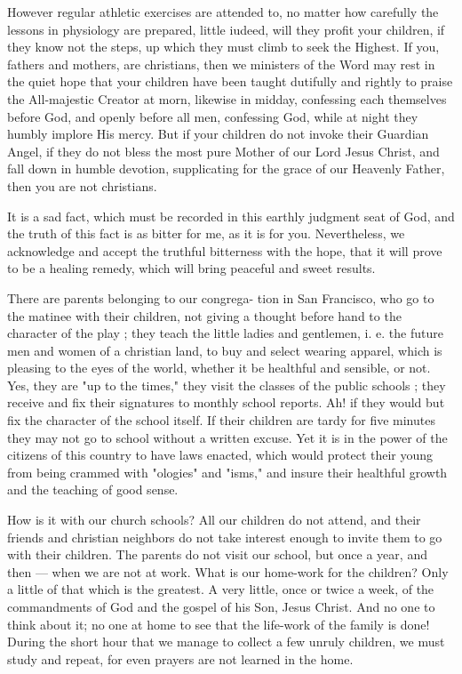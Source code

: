 However regular athletic exercises are attended
to, no matter how carefully the lessons 
in physiology are prepared, little iudeed, will 
they profit your children, if they know not the 
steps, up which they must climb to seek the 
Highest. If you, fathers and mothers, are 
christians, then we ministers of the Word may 
rest in the quiet hope that your children have 
been taught dutifully and rightly to praise the 
All-majestic Creator at morn, likewise in midday, 
confessing each themselves before God, and 
openly before all men, confessing God, while at 
night they humbly implore His mercy. But if 
your children do not invoke their Guardian
Angel, if they do not bless the most pure 
Mother of our Lord Jesus Christ, and fall 
down in humble devotion, supplicating for the 
grace of our Heavenly Father, then you are not 
christians. 

It is a sad fact, which must be recorded in 
this earthly judgment seat of God, and the 
truth of this fact is as bitter for me, as it is for 
you. Nevertheless, we acknowledge and accept 
the truthful bitterness with the hope, that it 
will prove to be a healing remedy, which will 
bring peaceful and sweet results. 

There are parents belonging to our congrega- 
tion in San Francisco, who go to the matinee 
with their children, not giving a thought before 
hand to the character of the play ; they teach 
the little ladies and gentlemen, i. e. the future 
men and women of a christian land, to buy and 
select wearing apparel, which is pleasing to the 
eyes of the world, whether it be healthful and 
sensible, or not. Yes, they are "up to the 
times," they visit the classes of the public 
schools ; they receive and fix their signatures 
to monthly school reports. Ah! if they would 
but fix the character of the school itself. If 
their children are tardy for five minutes they may 
not go to school without a written excuse. Yet 
it is in the power of the citizens of this country 
to have laws enacted, which would protect their 
young from being crammed with "ologies" and
"isms," and insure their healthful growth and 
the teaching of good sense. 

How is it with our church schools? All our 
children do not attend, and their friends and 
christian neighbors do not take interest enough to 
invite them to go with their children. The parents
do not visit our school, but once a year, and 
then — when we are not at work. What is our 
home-work for the children? Only a little of 
that which is the greatest. A very little, once or 
twice a week, of the commandments of God and 
the gospel of his Son, Jesus Christ. And no 
one to think about it; no one at home to see 
that the life-work of the family is done! During
the short hour that we manage to collect a 
few unruly children, we must study and repeat, 
for even prayers are not learned in the home. 

